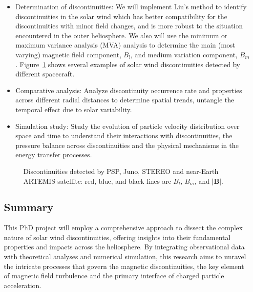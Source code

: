 \documentclass[
  letterpaper,
  DIV=11,
  numbers=noendperiod]{scrartcl}
\begin{document}
\begin{itemize}
\item
  Determination of discontinuities: We will implement Liu's \citep{liuMagneticDiscontinuitiesSolar2022} method to identify discontinuities in the solar wind which has better compatibility for the discontinuities with minor field changes, and is more robust to the situation encountered in the outer heliosphere. We also will use the minimum or maximum variance analysis (MVA) analysis \citep{sonnerupMinimumMaximumVariance1998, sonnerupMagnetopauseStructureAttitude1967} to determine the main (most varying) magnetic field component, \(B_l\), and medium variation component, \(B_m\). Figure~\ref{fig-examples} shows several examples of solar wind discontinuities detected by different spacecraft.
\item
  Comparative analysis: Analyze discontinuity occurrence rate and properties across different radial distances to determine spatial trends, untangle the temporal effect due to solar variability.
\item
  Simulation study: Study the evolution of particle velocity distribution over space and time to understand their interactions with discontinuities, the pressure balance across discontinuities and the physical mechanisms in the energy transfer processes.
\end{itemize}

\begin{figure}


\caption{\label{fig-examples}Discontinuities detected by PSP, Juno, STEREO and near-Earth ARTEMIS satellite: red, blue, and black lines are \(B_l\), \(B_m\), and \(|{\mathbf B}|\).}

\end{figure}%

\subsection{Summary}\label{summary}

This PhD project will employ a comprehensive approach to dissect the complex nature of solar wind discontinuities, offering insights into their fundamental properties and impacts across the heliosphere. By integrating observational data with theoretical analyses and numerical simulation, this research aims to unravel the intricate processes that govern the magnetic discontinuities, the key element of magnetic field turbulence and the primary interface of charged particle acceleration.
\end{document}
